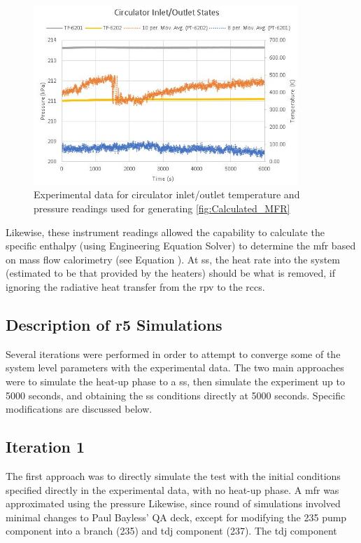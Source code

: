 \documentclass[double,12pt]{beavtex}
\begin{document}
\begin{figure}
    \begin{center}
    	\includegraphics[width=10cm]{Figures/Circ_Inlet_Outlet_State.JPG}
    	\caption{Experimental data for circulator inlet/outlet temperature and pressure readings used for generating \ref{fig:Calculated_MFR}}
    	\label{fig:Circ_Inlet_Outlet_State}
    	\end{center}
\end{figure}

Likewise, these instrument readings allowed the capability to calculate the specific enthalpy (using Engineering Equation Solver) to determine the \acrshort{mfr} based on mass flow calorimetry (see Equation ). At \acrshort{ss}, the heat rate into the system (estimated to be that provided by the heaters) should be what is removed, if ignoring the radiative heat transfer from the \acrshort{rpv} to the \acrshort{rccs}. 

\subsection{Description of \acrshort{r5} Simulations}

Several iterations were performed in order to attempt to converge some of the system level parameters with the experimental data. The two main approaches were to simulate the heat-up phase to a \acrshort{ss}, then simulate the experiment up to 5000 seconds, and obtaining the \acrshort{ss} conditions directly at 5000 seconds. Specific modifications are discussed below. 

\subsection{Iteration 1}

The first approach was to directly simulate the test with the initial conditions specified directly in the experimental data, with no heat-up phase. A \acrshort{mfr} was approximated using the pressure 
Likewise, since round of simulations involved minimal changes to Paul Bayless’ QA deck, except for modifying the 235 pump component into a branch (235) and \acrshort{tdj} component (237). The \acrshort{tdj} component 
\end{document}
